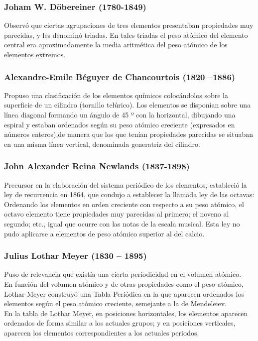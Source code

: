 \documentclass[12pt]{article}
\begin{document}
                    \subsubsection{Joham W. Döbereiner (1780-1849)}\label{sec:Joham W. Döbereiner (1780-1849)}
                         Observó que ciertas agrupaciones de tres elementos presentaban propiedades muy parecidas, y les denominó triadas. En tales triadas el peso atómico del elemento central era aproximadamente la media aritmética del peso atómico de los elementos extremos.
                    
                    \subsubsection{Alexandre-Emile Béguyer de Chancourtois (1820 –1886)}\label{sec:Alexandre-Emile Béguyer de Chancourtois (1820 –1886)}
                         Propuso una clasificación de los elementos químicos colocándolos sobre la superficie de un cilindro (tornillo telúrico). Los elementos se disponían sobre una línea diagonal formando un ángulo de 45 º con la horizontal, dibujando una espiral y estaban ordenados según su peso atómico creciente (expresados en números enteros),de manera que los que tenían propiedades parecidas se situaban en una misma línea vertical, denominada generatriz del cilindro.
                    
                    \subsubsection{John Alexander Reina Newlands (1837-1898)}\label{sec:John Alexander Reina Newlands (1837-1898)}
                         Precursor en la elaboración del sistema periódico de los elementos, estableció la ley de recurrencia en 1864, que condujo a establecer la llamada ley de las octavas: Ordenando los elementos en orden creciente con respecto a su peso atómico, el octavo elemento tiene propiedades muy parecidas al primero; el noveno al segundo; etc., igual que ocurre con las notas de la escala musical. Esta ley no pudo aplicarse a elementos de peso atómico superior al del calcio.

                    \subsubsection{Julius Lothar Meyer (1830 – 1895)}\label{sec:Julius Lothar Meyer (1830 – 1895)}
                         Puso de relevancia que existía una cierta periodicidad en el volumen atómico.\\
                         En función del volumen atómico y de otras propiedades como el peso atómico, Lothar Meyer construyó una Tabla Periódica en la que aparecen ordenados los elementos según el peso atómico creciente, semejante a la de Mendeleiev.\\
                         En la tabla de Lothar Meyer, en posiciones horizontales, los elementos aparecen ordenados de forma similar a los actuales grupos; y en posiciones verticales, aparecen los elementos correspondientes a los actuales periodos.
\end{document}
